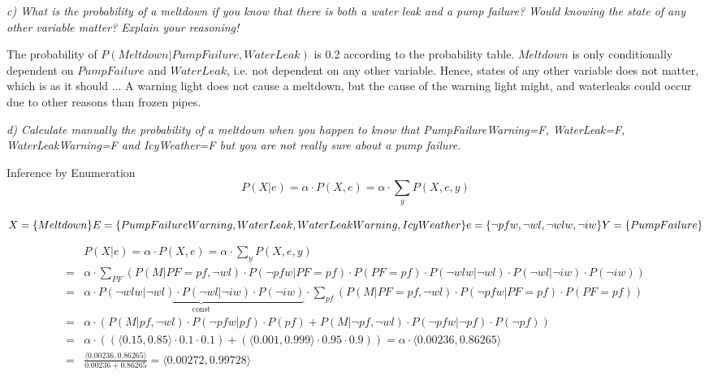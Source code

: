 \begin{framed}\em c) What is the probability of a meltdown if you know that there is both a water leak and a pump failure? Would knowing the state of any other variable matter? Explain your reasoning!\em\end{framed}

The probability of $P(Meltdown|PumpFailure, WaterLeak)$ is 0.2 according to the probability table. $Meltdown$ is only conditionally dependent on $PumpFailure$ and $WaterLeak$, i.e. not dependent on any other variable. Hence, states of any other variable does not matter, which is as it should ... A warning light does not cause a meltdown, but the cause of the warning light might, and waterleaks could occur due to other reasons than frozen pipes.

\begin{framed}\em d) Calculate manually the probability of a meltdown when you happen to know that PumpFailureWarning=F, WaterLeak=F, WaterLeakWarning=F and IcyWeather=F but you are not really sure about a pump failure. \em\end{framed}
\newpage

Inference by Enumeration
$$P(X|e) = \alpha\cdot P(X,e) = \alpha\cdot\sum_{y}P(X,e,y)$$

$X = \{Meltdown\}\\E=\{PumpFailureWarning, WaterLeak, WaterLeakWarning, IcyWeather\}\\e=\{\neg pfw, \neg wl, \neg wlw,\neg iw\}\\Y=\{PumpFailure\}$

\begin{align*}
  & P(X|e) = \alpha\cdot P(X,e) = \alpha\cdot\sum_{y}P(X,e,y)\\
  = & \alpha\cdot\sum_{PF}(P(M|PF=pf,\neg wl)\cdot
  P(\neg pfw | PF = pf)\cdot
  P(PF=pf)\cdot
  P(\neg wlw | \neg wl)\cdot
  P(\neg wl | \neg iw)\cdot
  P(\neg iw))\\
  = & \alpha\cdot \underbrace{P(\neg wlw | \neg wl)\cdot P(\neg wl | \neg iw)\cdot P(\neg iw)}_{\mathrm{const}}\cdot
  \sum_{pf}(P(M|PF = pf,\neg wl)\cdot
  P(\neg pfw|PF=pf)\cdot P(PF=pf))\\
  = & \alpha\cdot(P(M|pf,\neg wl)\cdot P(\neg pfw|pf)\cdot P(pf)
  + P(M|\neg pf, \neg wl)\cdot P(\neg pfw| \neg pf)\cdot P(\neg pf))\\
  = & \alpha\cdot((\langle 0.15,0.85\rangle \cdot 0.1\cdot 0.1)+(\langle 0.001, 0.999\rangle \cdot 0.95 \cdot 0.9))
  = \alpha\cdot\langle 0.00236,0.86265 \rangle\\
  = & \frac{\langle 0.00236,0.86265 \rangle}{0.00236+0.86265} = \langle 0.00272,0.99728  \rangle
\end{align*}

